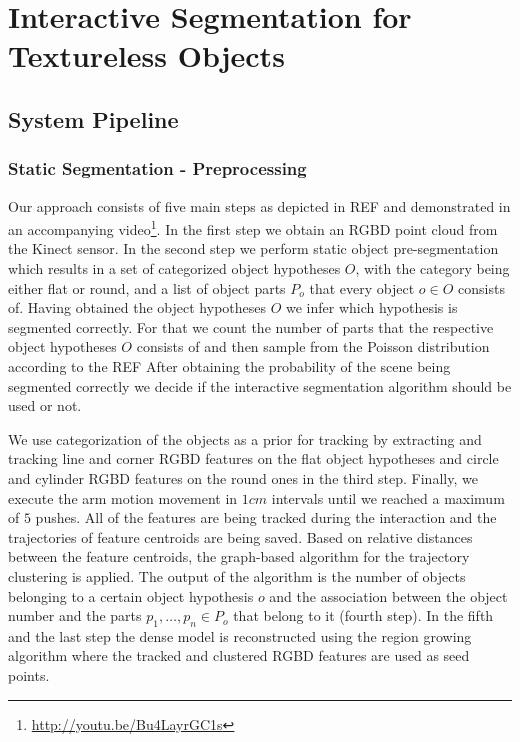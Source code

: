 \chapter{Interactive Segmentation for Textureless Objects}
\label{chapter:Textureless Segmentation}


\section{System Pipeline}
\subsection{Static Segmentation - Preprocessing}
 Our approach  
 consists of five main steps as depicted in REF%
  and demonstrated in an accompanying video\footnote{\url{http://youtu.be/Bu4LayrGC1s}}.
 In the first step we obtain an RGBD point cloud from the Kinect sensor. In the second step we perform static object
 pre-segmentation which results in a set of categorized object hypotheses $O$,
 with the category being either flat or round, and a list of object parts $P_{o}$ that every object 
 $o \in O$ consists of. Having obtained the object hypotheses $O$ we infer which hypothesis
 is segmented  correctly. For
 that we count the  number of parts that the respective object hypotheses $O$ 
 consists of and then sample from the Poisson distribution according to the REF%
 After obtaining the probability of the scene being segmented correctly we 
decide if the interactive segmentation algorithm should be used or not.

 We use categorization of the objects as a prior for tracking by 
 extracting and tracking line and corner RGBD features on the flat object hypotheses 
 and circle and cylinder RGBD features on the round ones in the third step. Finally, we 
 execute the arm motion movement in $1cm$ intervals until we reached a maximum of $5$ 
  pushes. All of the features are being tracked during the interaction 
 and the trajectories of feature centroids  are being  saved.  
Based  on  relative  distances between the feature centroids, the graph-based algorithm for the trajectory clustering is
 applied.  The  output  of  the  algorithm is  the  number  of  objects
 belonging  to a certain  object hypothesis $o$ and  the association  between the object
 number and the parts $p_{1},  \dots, p_{n} \in P_{o}$ that belong to it (fourth step).
 In the fifth and the last step the dense model is reconstructed using the region growing algorithm 
where the tracked and clustered RGBD features are
used as seed points.


